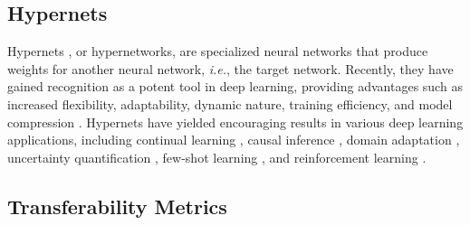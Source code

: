 \subsection{Hypernets}

Hypernets \citep{ha2017hypernetworks}, or hypernetworks, are specialized neural networks that produce weights for another neural network, \textit{i.e.}, the target network. Recently, they have gained recognition as a potent tool in deep learning, providing advantages such as increased flexibility, adaptability, dynamic nature, training efficiency, and model compression \citep{chauhan2023brief}. Hypernets have yielded encouraging results in various deep learning applications, including continual learning \citep{von2020continual}, causal inference \citep{chauhan2024dynamic}, domain adaptation \citep{volk2022example}, uncertainty quantification \citep{krueger2017bayesian}, few-shot learning \citep{sendera2023hypershot}, and reinforcement learning \citep{sarafian2021recomposing}.

\subsection{Transferability Metrics}


